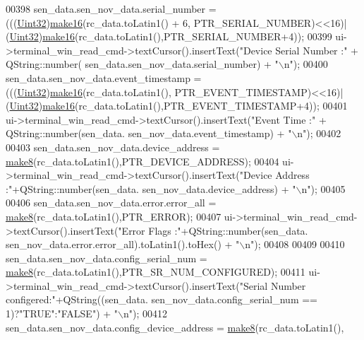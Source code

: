 \begin{DoxyCode}
00398       sen\_data.sen\_nov\_data.serial\_number =(((\hyperlink{a00004_ab56a7153a5b218eac7698ff141009735}{Uint32})\hyperlink{a00017_afcb06d9f3a6a555df9355af1dfbb4e21}{make16}(rc\_data.toLatin1() + 6,
      PTR\_SERIAL\_NUMBER)<<16)| (\hyperlink{a00004_ab56a7153a5b218eac7698ff141009735}{Uint32})\hyperlink{a00017_afcb06d9f3a6a555df9355af1dfbb4e21}{make16}(rc\_data.toLatin1(),PTR\_SERIAL\_NUMBER+4));
00399       ui->terminal\_win\_read\_cmd->textCursor().insertText(\textcolor{stringliteral}{"Device Serial Number :"} + QString::number(
      sen\_data.sen\_nov\_data.serial\_number) + \textcolor{stringliteral}{"\(\backslash\)n"});
00400       sen\_data.sen\_nov\_data.event\_timestamp = (((\hyperlink{a00004_ab56a7153a5b218eac7698ff141009735}{Uint32})\hyperlink{a00017_afcb06d9f3a6a555df9355af1dfbb4e21}{make16}(rc\_data.toLatin1(),
      PTR\_EVENT\_TIMESTAMP)<<16)| (\hyperlink{a00004_ab56a7153a5b218eac7698ff141009735}{Uint32})\hyperlink{a00017_afcb06d9f3a6a555df9355af1dfbb4e21}{make16}(rc\_data.toLatin1(),PTR\_EVENT\_TIMESTAMP+4));
00401       ui->terminal\_win\_read\_cmd->textCursor().insertText(\textcolor{stringliteral}{"Event Time    :"} + QString::number(sen\_data.
      sen\_nov\_data.event\_timestamp) + \textcolor{stringliteral}{"\(\backslash\)n"});
00402 
00403       sen\_data.sen\_nov\_data.device\_address = \hyperlink{a00017_aebce94d5e6af7afff661daf74b208de1}{make8}(rc\_data.toLatin1(),PTR\_DEVICE\_ADDRESS);
00404       ui->terminal\_win\_read\_cmd->textCursor().insertText(\textcolor{stringliteral}{"Device Address  :"}+QString::number(sen\_data.
      sen\_nov\_data.device\_address) + \textcolor{stringliteral}{"\(\backslash\)n"});
00405 
00406       sen\_data.sen\_nov\_data.error.error\_all = \hyperlink{a00017_aebce94d5e6af7afff661daf74b208de1}{make8}(rc\_data.toLatin1(),PTR\_ERROR);
00407       ui->terminal\_win\_read\_cmd->textCursor().insertText(\textcolor{stringliteral}{"Error Flags  :"}+QString::number(sen\_data.
      sen\_nov\_data.error.error\_all).toLatin1().toHex() + \textcolor{stringliteral}{"\(\backslash\)n"});
00408 
00409 
00410       sen\_data.sen\_nov\_data.config\_serial\_num = \hyperlink{a00017_aebce94d5e6af7afff661daf74b208de1}{make8}(rc\_data.toLatin1(),PTR\_SR\_NUM\_CONFIGURED);
00411       ui->terminal\_win\_read\_cmd->textCursor().insertText(\textcolor{stringliteral}{"Serial Number configered:"}+QString((sen\_data.
      sen\_nov\_data.config\_serial\_num == 1)?\textcolor{stringliteral}{"TRUE"}:\textcolor{stringliteral}{"FALSE"}) + \textcolor{stringliteral}{"\(\backslash\)n"});
00412       sen\_data.sen\_nov\_data.config\_device\_address = \hyperlink{a00017_aebce94d5e6af7afff661daf74b208de1}{make8}(rc\_data.toLatin1(),

\end{DoxyCode}
